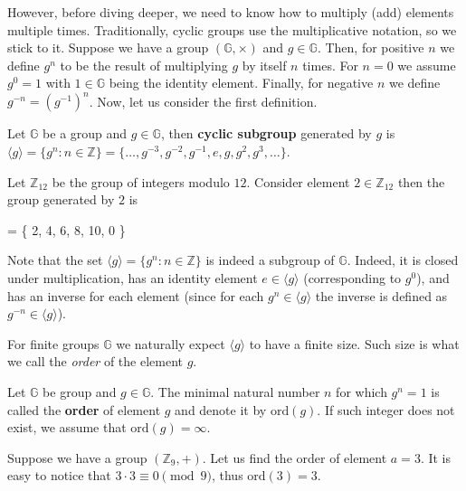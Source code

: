 \documentclass[../lecture-notes-148x210.tex]{subfiles}
\begin{document}
However, before diving deeper, we need to know how to multiply (add) elements
multiple times. Traditionally, cyclic groups use the multiplicative notation, so
we stick to it. Suppose we have a group $(\mathbb{G},\times)$ and $g \in
\mathbb{G}$. Then, for positive $n$ we define $g^n$ to be the result of
multiplying $g$ by itself $n$ times. For $n=0$ we assume $g^0=1$ with $1 \in
\mathbb{G}$ being the identity element. Finally, for negative $n$ we define
$g^{-n} = (g^{-1})^n$. Now, let us consider the first definition.
\begin{definition}
    Let $\mathbb{G}$ be a group and $g \in \mathbb{G}$, then \textbf{cyclic subgroup} generated 
    by $g$ is $\langle g \rangle = \{g^n: n \in \mathbb{Z}\} = 
    \{\dots,g^{-3}, g^{-2}, g^{-1}, e, g, g^2, g^3, \dots\}$.
\end{definition}

\begin{example}
    Let $\mathbb{Z}_{12}$ be the group of integers modulo $12$. 
    Consider element $2 \in \mathbb{Z}_{12}$ then the group generated by $2$ is
    \begin{xequation}
         \rangle = \{ 2, 4, 6, 8, 10, 0 \}
    \end{xequation}
\end{example}

\vspace{-1mm}

Note that the set $\langle g \rangle = \{g^n: n \in \mathbb{Z}\}$ is indeed a
subgroup of $\mathbb{G}$. Indeed, it is closed under multiplication, has an
identity element $e \in \langle g \rangle$ (corresponding to $g^0$), and has an
inverse for each element (since for each $g^n \in \langle g \rangle$ the inverse is defined 
as $g^{-n} \in \langle g \rangle$).

For finite groups $\mathbb{G}$ we naturally expect $\langle g \rangle$ to have a finite 
size. Such size is what we call the \textit{order} of the element $g$.

\vspace{-1mm}

\begin{definition}
    Let $\mathbb{G}$ be group and $g \in \mathbb{G}$. The minimal natural number
    $n$ for which $g^n = 1$ is called the \textbf{order} of element $g$ and
    denote it by $\text{ord}(g)$. If such integer does not exist, we assume that
    $\text{ord}(g)=\infty$.
\end{definition}

\begin{example}
    Suppose we have a group $(\mathbb{Z}_9, +)$. Let us find the order of
    element $a = 3$. It is easy to notice that $3 \cdot 3 \equiv 0 \pmod{9}$,
    thus $\text{ord}(3) = 3$.
\end{example}
\end{document}
